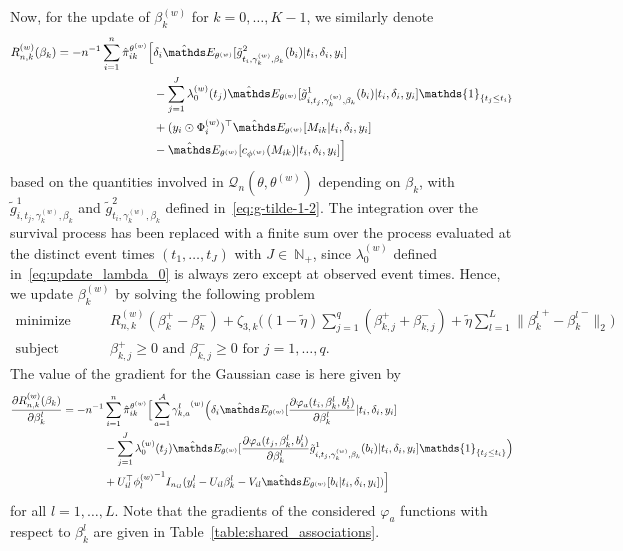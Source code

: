 \documentclass[11pt]{article}
\newcommand{\ind}[1]{\mathds{1}_{#1}}
\newcommand{\norm}[1]{\|#1\|}
\newcommand{\cQ}{\mathcal Q}
\newcommand{\N}{\mathds N}
\newcommand{\E}{\mathds E}
\begin{document}
Now, for the update of $\beta_k^{(w)}$ for $k=0, \ldots, K-1$, we similarly denote
\begin{align*}
  R^{(w)}_{n,k}(\beta_k) = -n^{-1} \sum_{i=1}^n \hat \pi_{ik}^{\theta^{(w)}} \Big[ &\delta_i \hat \E_{\theta^{(w)}}[ \tilde g_{t_i, \gamma_k^{(w)}, \beta_k}^2(b_i) | t_i, \delta_i, y_i] \\
  & - \sum_{j=1}^J \lambda_0^{(w)}(t_j) \hat \E_{\theta^{(w)}}[ \tilde g_{i, t_j, \gamma_k^{(w)}, \beta_k}^1(b_i) | t_i, \delta_i, y_i] \ind{\{t_j\leq t_i\}} \\
  & + (y_i \odot \Phi_i^{(w)})^\top \hat \E_{\theta^{(w)}}[ M_{ik} | t_i, \delta_i, y_i] \\
  & - \hat \E_{\theta^{(w)}}[ c_{\phi^{(w)}}(M_{ik}) | t_i, \delta_i, y_i] \Big] 
\end{align*}
based on the quantities involved in $\cQ_n(\theta, \theta^{(w)})$ depending on $\beta_k$, with $\tilde g_{i, t_j, \gamma_k^{(w)}, \beta_k}^1$ and $\tilde g_{t_i, \gamma_k^{(w)}, \beta_k}^2$ defined in~\eqref{eq:g-tilde-1-2}. The integration over the survival process has been replaced with a finite sum over the process evaluated at the distinct event times $(t_1, \ldots, t_J)$ with $J \in~\N_+$, since $\lambda_0^{(w)}$ defined in~\eqref{eq:update_lambda_0} is always zero except at observed event times.
Hence, we update $\beta_k^{(w)}$ by solving the following problem
\begin{equation}
  \label{eq:sub-problem-beta_k}
  \begin{split}
    \text{minimize}& \quad \quad R_{n, k}^{(w)}(\beta_k^+ - \beta_k^-) + \zeta_{3,k} \big((1 - \tilde \eta) \sum_{j=1}^q (\beta_{k,j}^+ + \beta_{k,j}^-) + \tilde \eta \sum_{l=1}^L \norm{{\beta_k^l}^+ - {\beta_k^l}^-}_2 \big) \\
    \text{subject to}& \quad \quad \beta_{k,j}^+ \geq 0 \text{ and } \beta_{k,j}^- \geq 0 \text{ for } j = 1, \ldots, q.
  \end{split} 
\end{equation}
The value of the gradient for the Gaussian case is here given by
\begin{align}
  \label{eq:grad-beta_k}
  \frac{\partial R_{n,k}^{(w)}(\beta_k)}{\partial \beta_k^l} = -n^{-1} &\sum_{i=1}^n \hat \pi_{ik}^{\theta^{(w)}} \Big[\sum_{a=1}^\mathcal{A} {\gamma_{k,a}^l}^{(w)} \Big( \delta_i  \hat \E_{\theta^{(w)}}[ \frac{\partial \varphi_a(t_i, \beta_k^l, b_i^l)}{\partial \beta_k^l} | t_i, \delta_i, y_i] \\ \nonumber
  &- \sum_{j=1}^J \lambda_0^{(w)}(t_j) \hat \E_{\theta^{(w)}}[ \frac{\partial \varphi_a(t_j, \beta_k^l, b_i^l)}{\partial \beta_k^l} \tilde g_{i, t_j, \gamma_k^{(w)}, \beta_k}^1(b_i) | t_i, \delta_i, y_i] \ind{\{t_j\leq t_i\}} \Big) \\ \nonumber
  &+ U_{il}^\top {\phi_l^{(w)}}^{-1}I_{n_{il}} (y_i^l - U_{il}\beta_k^l - V_{il}\hat \E_{\theta^{(w)}}[ b_i | t_i, \delta_i, y_i])\Big]
\end{align}
for all $l = 1, \ldots, L$. Note that the gradients of the considered $\varphi_a$ functions with respect to $\beta_k^l$ are given in Table~\ref{table:shared_associations}. 
\end{document}
